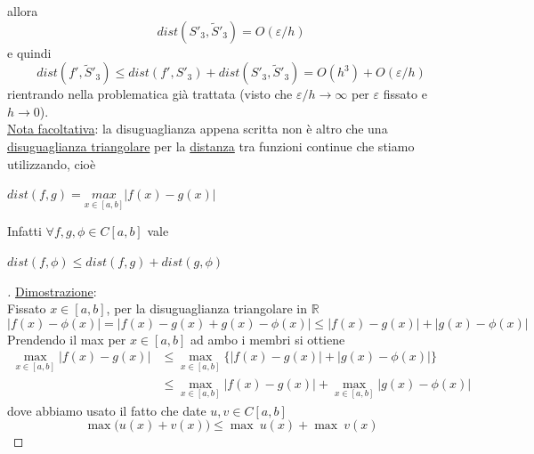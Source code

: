 \documentclass[12pt,a4paper]{article}
\begin{document}
allora
\[
dist(S'_3, \tilde{S}'_3) = O(\varepsilon/h)
\]
e quindi 
\[
dist(f',\tilde{S}'_3) \le dist(f', S'_3) + dist(S'_3, \tilde{S}'_3) = O(h^3) + O(\varepsilon/h)
\]
rientrando nella problematica già trattata (visto che $\varepsilon/h \to \infty$ per $\varepsilon$ fissato e $h \to 0$).\\
\uline{Nota facoltativa}: la disuguaglianza appena scritta non è altro che una \uline{disuguaglianza triangolare} per la \uline{distanza} tra funzioni continue che stiamo utilizzando, cioè \\
\begin{center}
$dist(f,g) = \underset{x \in [a,b]}{max} |f(x)-g(x)|$\\
\end{center}
Infatti $\forall f,g,\phi \in C[a,b]$ vale \\
\begin{center}
$dist(f,\phi)\leq dist(f,g) + dist(g,\phi)$\\
\end{center}

\begin{proof}[\unskip\nopunct]
\uline{Dimostrazione}:\\
Fissato $x\in [a,b]$, per la disuguaglianza triangolare in $\mathbb{R}$
\[
| f(x) - \phi(x) | = | f(x) - g(x) + g(x) - \phi(x) | \leq | f(x) - g(x) | + | g(x) - \phi(x) |
\]
Prendendo il max per $x \in [a,b]$ ad ambo i membri si ottiene
\[ \begin{split}
\underset{x \in [a,b]}{\max} |f(x)-g(x)| & \leq \underset{x \in [a,b]}{\max} \{ |f(x)-g(x)| + |g(x)-\phi(x)| \} \\
& \leq \underset{x \in [a,b]}{\max} |f(x)-g(x)|+ \underset{x \in [a,b]}{\max} |g(x)-\phi(x)|
\end{split} \]
dove abbiamo usato il fatto che date $u,v \in C[a,b]$
\[
\max\Big( u(x)+v(x) \Big) \leq \max \ u(x) + \max \ v(x)
\]
\end{proof}
\end{document}
